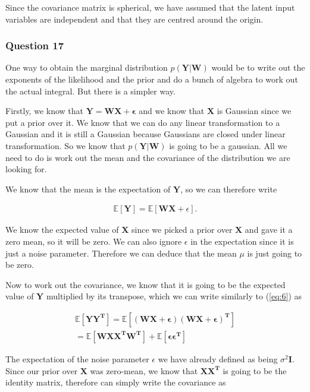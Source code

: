 \documentclass[10pt, a4paper, twocolumn]{article} %
\begin{document}
Since the covariance matrix is spherical, we have assumed that the latent input variables are independent and that they are centred around the origin. 

\subsubsection*{Question 17}

One way to obtain the marginal distribution $p(\mathbf{Y|W})$ would be to write out the exponents of the likelihood and the prior and do a bunch of algebra to work out the actual integral. But there is a simpler way.

Firstly, we know that $\mathbf{Y = WX + \epsilon}$ and we know that $\mathbf{X}$ is Gaussian since we put a prior over it. We know that we can do any linear transformation to a Gaussian and it is still a Gaussian because Gaussians are closed under linear transformation. So we know that $p(\mathbf{Y|W})$ is going to be a gaussian. All we need to do is work out the mean and the covariance of the distribution we are looking for.

We know that the mean is the expectation of $\mathbf{Y}$, so we can therefore write

\begin{align} \label{eq:6}
  \mathbb{E}[\mathbf{Y}] = \mathbb{E}[\mathbf{WX} + \epsilon].
\end{align}

We know the expected value of $\mathbf{X}$ since we picked a prior over $\mathbf{X}$ and gave it a zero mean, so it will be zero. We can also ignore $\epsilon$ in the expectation since it is just a noise parameter. Therefore we can deduce that the mean $\mu$ is just going to be zero.

Now to work out the covariance, we know that it is going to be the expected value of $\mathbf{Y}$ multiplied by its transpose, which we can write similarly to (\ref{eq:6}) as

\begin{align}
  \mathbb{E}[\mathbf{YY^T}] = \mathbb{E}[\mathbf{(WX + \epsilon)(WX + \epsilon)^T}] \\
  = \mathbb{E}[\mathbf{WXX^TW^T}] + \mathbb{E}[\mathbf{\epsilon\epsilon^T}]
\end{align}

The expectation of the noise parameter $\epsilon$ we have already defined as being $\sigma^2\mathbf{I}$. Since our prior over $\mathbf{X}$ was zero-mean, we know that $\mathbf{XX^T}$ is going to be the identity matrix, therefore can simply write the covariance as
\end{document}

